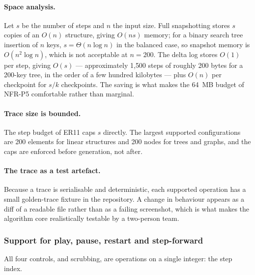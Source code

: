 \documentclass[11pt,a4paper]{article}
\begin{document}
\paragraph{Space analysis.} Let $s$ be the number of steps and $n$ the input size. Full
snapshotting stores $s$ copies of an $O(n)$ structure, giving $O(ns)$ memory; for a binary
search tree insertion of $n$ keys, $s = \Theta(n \log n)$ in the balanced case, so snapshot
memory is $O(n^2 \log n)$, which is not acceptable at $n = 200$. The delta log stores
$O(1)$ per step, giving $O(s)$ --- approximately 1{,}500 steps of roughly 200 bytes for a
200-key tree, in the order of a few hundred kilobytes --- plus $O(n)$ per checkpoint for
$s/k$ checkpoints. The saving is what makes the 64~MB budget of NFR-P5 comfortable rather
than marginal.

\paragraph{Trace size is bounded.} The step budget of ER11 caps $s$ directly. The largest
supported configurations are 200 elements for linear structures and 200 nodes for trees and
graphs, and the caps are enforced before generation, not after.

\paragraph{The trace as a test artefact.} Because a trace is serialisable and deterministic,
each supported operation has a small golden-trace fixture in the repository. A change in
behaviour appears as a diff of a readable file rather than as a failing screenshot, which is
what makes the algorithm core realistically testable by a two-person team.

\subsubsection{Support for play, pause, restart and step-forward}

All four controls, and scrubbing, are operations on a single integer: the step index.
\end{document}
